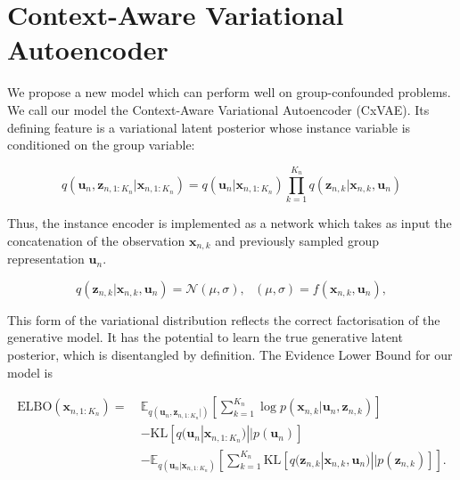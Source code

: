 \documentclass{article} %
\newcommand{\todo}[1]{\textcolor{red}{#1}}
\begin{document}
\section{Context-Aware Variational Autoencoder}

We propose a new model which can perform well on group-confounded problems. We call our model the Context-Aware Variational Autoencoder (CxVAE). Its defining feature is a variational latent posterior whose instance variable is conditioned on the group variable:

\begin{equation*}
q(\mathbf{u}_n, \mathbf{z}_{n, 1:K_n}  | \mathbf{x}_{n, 1:K_n} ) = q(\mathbf{u}_n | \mathbf{x}_{n, 1:K_n} ) \prod_{k=1}^{K_n} q(\mathbf{z}_{n,k} | \mathbf{x}_{n,k},  \mathbf{u}_n)
\end{equation*}

Thus, the instance encoder is implemented as a network which takes as input the concatenation of the observation $\mathbf{x}_{n,k}$ and previously sampled group representation $\mathbf{u}_n$.

\begin{equation*}
q(\mathbf{z}_{n,k} | \mathbf{x}_{n,k}, \mathbf{u}_n) = \mathcal{N} (\mu, \sigma), ~~~ (\mu, \sigma) = f (\mathbf{x}_{n,k}, \mathbf{u}_n),
\end{equation*}


This form of the variational distribution reflects the correct factorisation of the generative model. It has the potential to learn the true generative latent posterior, which is disentangled by definition. The Evidence Lower Bound for our model is


\begin{equation} \begin{aligned}
\mathrm{ELBO} (\mathbf{x}_{n, 1:K_n}) = ~ & \mathbb{E}_{q(\mathbf{u}_n, \mathbf{z}_{n, 1:K_n} | )} \left[\sum_{k=1}^{K_n} \log p(\mathbf{x}_{n,k} | \mathbf{u}_n, \mathbf{z}_{n,k})\right] \\ & - \mathrm{KL} [q(\mathbf{u}_n| \mathbf{x}_{n,1:K_n}) || p(\mathbf{u}_n)] \\ & - \mathbb{E}_{q(\mathbf{u}_n | \mathbf{x}_{n,1:K_n})}\left[\sum_{k=1}^{K_n} \mathrm{KL}[q(\mathbf{z}_{n,k} | \mathbf{x}_{n,k},\mathbf{u}_n) || p(\mathbf{z}_{n,k})]\right].
\end{aligned} \end{equation}
\end{document}
